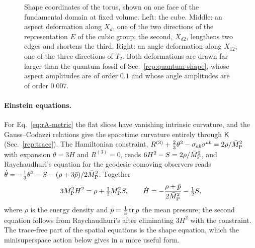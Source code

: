 \begin{figure}[tbp]
\centering
{}
\caption{Shape coordinates of the torus, shown on one face of the fundamental domain at fixed volume.
Left: the cube.
Middle: an aspect deformation along $X_d$, one of the two directions of the representation $E$ of the cubic group; the second, $X_{d2}$, lengthens two edges and shortens the third.
Right: an angle deformation along $X_{12}$, one of the three directions of $T_2$.
Both deformations are drawn far larger than the quantum fossil of Sec.~\ref{rep:quantum-shape}, whose aspect amplitudes are of order $0.1$ and whose angle amplitudes are of order $0.007$.}
\label{fig:rA-shapes}
\end{figure}

\paragraph{Einstein equations.}
For Eq.~\eqref{eq:rA-metric} the flat slices have vanishing intrinsic curvature, and the Gauss--Codazzi relations give the spacetime curvature entirely through $\mathsf K$ (Sec.~\ref{rep:trace}).
The Hamiltonian constraint, $R^{(3)}+\tfrac23\theta^2-\sigma_{ab}\sigma^{ab}=2\rho/\bar M_{\mathrm{P}}^2$ with expansion $\theta=3H$ and $R^{(3)}=0$, reads $6H^2-S=2\rho/\bar M_{\mathrm{P}}^2$, and Raychaudhuri's equation for the geodesic comoving observers reads $\dot\theta=-\tfrac13\theta^2-S-(\rho+3\bar p)/2\bar M_{\mathrm{P}}^2$.
Together
\begin{equation}
3\bar M_{\mathrm{P}}^2H^2=\rho+\tfrac12\bar M_{\mathrm{P}}^2S,\qquad
\dot H=-\frac{\rho+\bar p}{2\bar M_{\mathrm{P}}^2}-\tfrac12S ,
\label{eq:rA-einstein}
\end{equation}
where $\rho$ is the energy density and $\bar p=\tfrac13\operatorname{tr} p$ the mean pressure; the second equation follows from Raychaudhuri's after eliminating $3H^2$ with the constraint.
The trace-free part of the spatial equations is the shape equation, which the minisuperspace action below gives in a more useful form.

